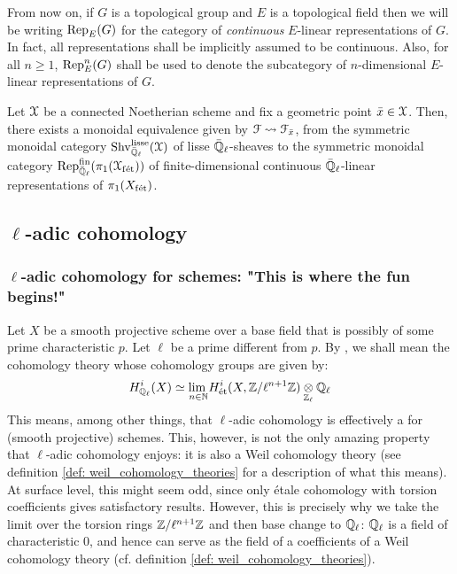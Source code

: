             \begin{convention} \label{conv: continuous_linear_representations}
                From now on, if $G$ is a topological group and $E$ is a topological field then we will be writing $\mathrm{Rep}_E(G)$ for the category of \textit{continuous} $E$-linear representations of $G$. In fact, all representations shall be implicitly assumed to be continuous. Also, for all $n \geq 1$, $\mathrm{Rep}_E^n(G)$ shall be used to denote the subcategory of $n$-dimensional $E$-linear representations of $G$.
            \end{convention}
            \begin{theorem} \label{theorem: galois_representations_are_lisse_sheaves}
                \cite[Theorem 1.4.5.7]{conrad_etale_cohomology} Let $\mathcal{X}$ be a connected Noetherian scheme and fix a geometric point $\bar{x} \in \mathcal{X}$. Then, there exists a monoidal equivalence given by $\mathcal{F} \leadsto \mathcal{F}_{\bar{x}}$, from the symmetric monoidal category $\mathrm{Shv}_{\bar{\mathbb{Q}}_{\ell}}^{\mathrm{lisse}}(\mathcal{X})$ of lisse $\bar{\mathbb{Q}}_{\ell}$-sheaves to the symmetric monoidal category $\mathrm{Rep}_{\bar{\mathbb{Q}}_{\ell}}^{\mathrm{fin}}(\pi_1(\mathcal{X}_{\mathrm{f\acute{e}t}}))$ of finite-dimensional continuous $\bar{\mathbb{Q}}_{\ell}$-linear representations of $\pi_1(X_{\mathrm{f\acute{e}t}})$.
            \end{theorem}

    \subsection{\texorpdfstring{$\ell$}{}-adic cohomology}
        \subsubsection{\texorpdfstring{$\ell$}{}-adic cohomology for schemes: "This is where the fun begins!"}
            Let $X$ be a smooth projective scheme over a base field that is possibly of some prime characteristic $p$. Let $\ell$ be a prime different from $p$. By , we shall mean the cohomology theory whose cohomology groups are given by:
                $$H^i_{\Q_{\ell}}(X) \cong \underset{n \in \N}{\lim} H_{\et}^i(X, \Z/\ell^{n + 1}\Z) \tensor_{\Z_{\ell}} \Q_{\ell}$$
            This means, among other things, that $\ell$-adic cohomology is effectively a  for (smooth projective) schemes. This, however, is not the only amazing property that $\ell$-adic cohomology enjoys: it is also a Weil cohomology theory (see definition \ref{def: weil_cohomology_theories} for a description of what this means). At surface level, this might seem odd, since only \'etale cohomology with torsion coefficients gives satisfactory results. However, this is precisely why we take the limit over the torsion rings $\mathbb{Z}/\ell^{n + 1}\mathbb{Z}$ and then base change to $\mathbb{Q}_{\ell}$: $\mathbb{Q}_{\ell}$ is a field of characteristic $0$, and hence can serve as the field of a coefficients of a Weil cohomology theory (cf. definition \ref{def: weil_cohomology_theories}). 
            
